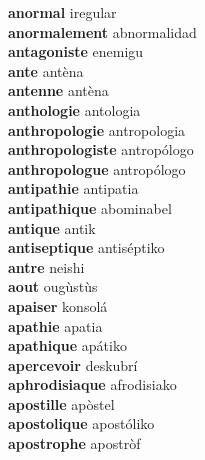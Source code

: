 \textbf{anormal } iregular \\
\textbf{anormalement } abnormalidad \\
\textbf{antagoniste } enemigu \\
\textbf{ante } antèna \\
\textbf{antenne } antèna \\
\textbf{anthologie } antologia \\
\textbf{anthropologie } antropologia \\
\textbf{anthropologiste } antropólogo \\
\textbf{anthropologue } antropólogo \\
\textbf{antipathie } antipatia \\
\textbf{antipathique } abominabel \\
\textbf{antique } antik \\
\textbf{antiseptique } antiséptiko \\
\textbf{antre } neishi \\
\textbf{aout } ougùstùs \\
\textbf{apaiser } konsolá \\
\textbf{apathie } apatia \\
\textbf{apathique } apátiko \\
\textbf{apercevoir } deskubrí \\
\textbf{aphrodisiaque } afrodisiako \\
\textbf{apostille } apòstel \\
\textbf{apostolique } apostóliko \\
\textbf{apostrophe } apostròf \\
